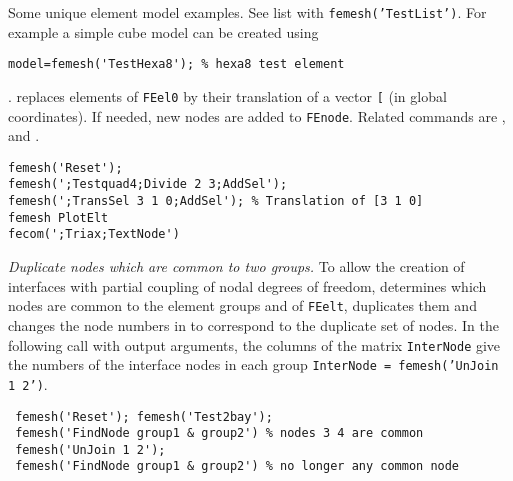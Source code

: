 
Some unique element model examples. See list with {\tt femesh('TestList')}.
For example a simple cube model can be created using\\
\begin{verbatim}
model=femesh('TestHexa8'); % hexa8 test element
\end{verbatim}%



.   replaces elements of {\tt FEel0} by their translation of a vector {\tt [}\tsi{tx ty tz}{\tt ]} (in global coordinates).  If needed, new nodes are added to {\tt FEnode}.  Related commands are ,  and .

\begin{verbatim}
femesh('Reset');
femesh(';Testquad4;Divide 2 3;AddSel'); 
femesh(';TransSel 3 1 0;AddSel'); % Translation of [3 1 0]
femesh PlotElt
fecom(';Triax;TextNode')
\end{verbatim}%



{\sl Duplicate nodes which are common to two groups.} To allow the creation of interfaces with partial coupling of nodal degrees of freedom,  determines which nodes are common to the element groups  and  of {\tt FEelt}, duplicates them and changes the node numbers in  to correspond to the duplicate set of nodes. In the following call with output arguments, the columns of the matrix {\tt InterNode} give the numbers of the interface nodes in each group {\tt InterNode = femesh('UnJoin 1 2')}.

\begin{verbatim}
 femesh('Reset'); femesh('Test2bay');
 femesh('FindNode group1 & group2') % nodes 3 4 are common
 femesh('UnJoin 1 2');
 femesh('FindNode group1 & group2') % no longer any common node
\end{verbatim}%

